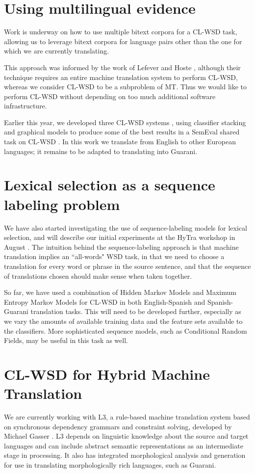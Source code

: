 \documentclass{article}
\begin{document}
\section{Using multilingual evidence}
Work is underway on how to use multiple bitext corpora for a CL-WSD task,
allowing us to leverage bitext corpora for language pairs other than the one
for which we are currently translating.

This approach was informed by the work of Lefever and Hoste
\cite{lefever-hoste-decock:2011:ACL-HLT2011}, although their technique requires
an entire machine translation system to perform CL-WSD, whereas we consider
CL-WSD to be a subproblem of MT. Thus we would like to perform CL-WSD without
depending on too much additional software infrastructure.

Earlier this year, we developed three CL-WSD systems
\cite{rudnick-liu-gasser:2013:SemEval-2013}, using classifier stacking and
graphical models to produce some of the best results in a SemEval shared task
on CL-WSD \cite{task10}. In this work we translate from English to other
European languages; it remains to be adapted to translating into Guarani.

\section{Lexical selection as a sequence labeling problem}
We have also started investigating the use of sequence-labeling models for
lexical selection, and will describe our initial experiments at the HyTra
workshop in August \cite{rudnick-gasser:2013:HyTra-2013}. The intuition behind
the sequence-labeling approach is that machine translation implies an
``all-words" WSD task, in that we need to choose a translation for every word
or phrase in the source sentence, and that the sequence of translations chosen
should make sense when taken together.

So far, we have used a combination of Hidden Markov Models and Maximum Entropy
Markov Models for CL-WSD in both English-Spanish and Spanish-Guarani
translation tasks. This will need to be developed further, especially as we
vary the amounts of available training data and the feature sets available to
the classifiers. More sophisticated sequence models, such as Conditional Random
Fields, may be useful in this task as well.

\section{CL-WSD for Hybrid Machine Translation}
We are currently working with L3, a rule-based machine translation system based
on synchronous dependency grammars and constraint solving, developed by Michael
Gasser . L3 depends on linguistic
knowledge about the source and target languages and can include abstract
semantic representations as an intermediate stage in processing. It also has
integrated morphological analysis and generation for use in translating
morphologically rich languages, such as Guarani.
\end{document}
